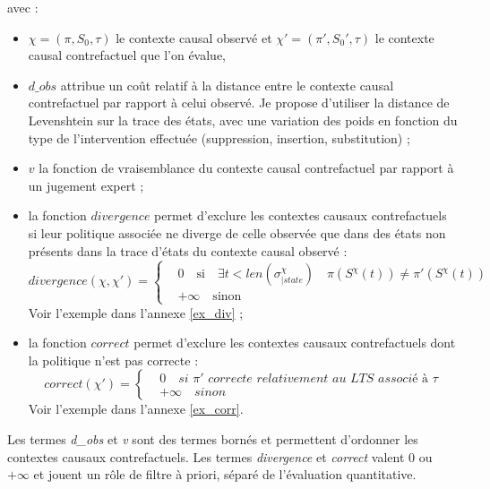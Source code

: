 avec :
\begin{itemize}
    \item $\chi= (\pi,S_0,\tau)$ le contexte causal observé et $\chi' = (\pi',S_0',\tau)$ le contexte causal contrefactuel que l'on évalue, 
    \item $d\_obs$ attribue un coût relatif à la distance entre le contexte causal contrefactuel par rapport à celui observé.  Je propose d'utiliser la distance de Levenshtein sur la trace des états, avec une variation des poids en fonction du type de l'intervention effectuée (suppression, insertion, substitution) ;
    \item $v$ la fonction de vraisemblance du contexte causal contrefactuel par rapport à un jugement expert ;
    \item la fonction $divergence$ permet d'exclure les contextes causaux contrefactuels si leur politique associée ne diverge de celle observée que dans des états non présents dans la trace d'états du contexte causal observé :
    \begin{equation}
        divergence(\chi,\chi') = \begin{cases}
             & 0 \quad \text{si} \quad \exists t<len(\sigma^{\chi}_{|state}) \quad \pi(S^\chi(t))\neq \pi'(S^{\chi}(t))
             \\
             &+\infty \quad \text{sinon}
        \end{cases}
    \end{equation}
    Voir l'exemple dans l'annexe \ref{ex_div} ;

    \item la fonction $correct$ permet d'exclure les contextes causaux contrefactuels dont la politique n'est pas correcte : 
    \begin{equation}
        correct(\chi') = \begin{cases}
            & 0 \quad \textit{si $\pi'$ correcte relativement au LTS associé à $\tau$} \\
            & +\infty \quad sinon
        \end{cases}
    \end{equation}
    Voir l'exemple dans l'annexe \ref{ex_corr}.

\end{itemize}

Les termes \textit{d\_obs} et \textit{v} sont des termes bornés et permettent d'ordonner les contextes causaux contrefactuels. Les termes \textit{divergence} et \textit{correct} valent 0 ou $+\infty$ et jouent un rôle de filtre à priori, séparé de l'évaluation quantitative.

